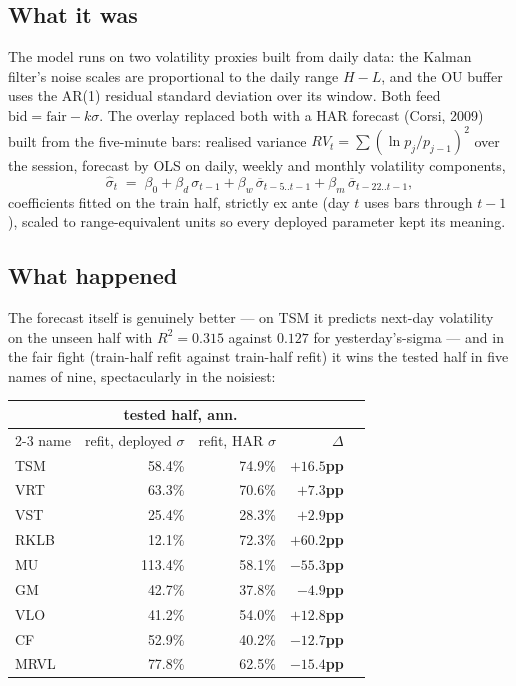\documentclass[11pt,a4paper]{article}
\newcommand{\good}[1]{{\color{bcteal}\textbf{#1}}}
\newcommand{\bad}[1]{{\color{bcred}\textbf{#1}}}
\begin{document}
\subsection{What it was}

The model runs on two volatility proxies built from daily data: the Kalman
filter's noise scales are proportional to the daily range $H-L$, and the OU
buffer uses the AR(1) residual standard deviation over its window. Both feed
$\text{bid} = \text{fair} - k\sigma$. The overlay replaced both with a HAR
forecast (Corsi, 2009) built from the five-minute bars: realised variance
$RV_t = \sum \left(\ln p_{j}/p_{j-1}\right)^2$ over the session, forecast by OLS on
daily, weekly and monthly volatility components,
\[
\hat\sigma_t \;=\; \beta_0 + \beta_d\,\sigma_{t-1}
 + \beta_w\,\overline{\sigma}_{t-5..t-1}
 + \beta_m\,\overline{\sigma}_{t-22..t-1},
\]
coefficients fitted on the train half, strictly ex ante (day $t$ uses bars
through $t-1$), scaled to range-equivalent units so every deployed parameter
kept its meaning.

\subsection{What happened}

The forecast itself is genuinely better --- on TSM it predicts next-day
volatility on the unseen half with $R^2 = 0.315$ against $0.127$ for
yesterday's-sigma --- and in the fair fight (train-half refit against train-half
refit) it wins the tested half in five names of nine, spectacularly in the
noisiest:

\begin{center}
\begin{tabular}{lrrrr}
\toprule
 & \multicolumn{2}{c}{tested half, ann.} & & \\
\cmidrule(lr){2-3}
name & refit, deployed $\sigma$ & refit, HAR $\sigma$ & $\Delta$ & \\
\midrule
TSM  & 58.4\% & 74.9\% & \good{$+16.5$pp} & \\
VRT  & 63.3\% & 70.6\% & \good{$+7.3$pp} & \\
VST  & 25.4\% & 28.3\% & \good{$+2.9$pp} & \\
RKLB & 12.1\% & 72.3\% & \good{$+60.2$pp} & \\
MU   & 113.4\% & 58.1\% & \bad{$-55.3$pp} & \\
GM   & 42.7\% & 37.8\% & \bad{$-4.9$pp} & \\
VLO  & 41.2\% & 54.0\% & \good{$+12.8$pp} & \\
CF   & 52.9\% & 40.2\% & \bad{$-12.7$pp} & \\
MRVL & 77.8\% & 62.5\% & \bad{$-15.4$pp} & \\
\bottomrule
\end{tabular}
\end{center}
\end{document}
